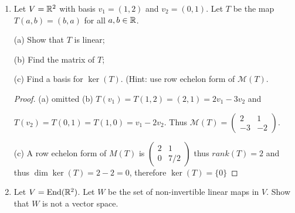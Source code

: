 \documentclass{amsart}
\begin{document}
\begin{enumerate}
(a) Does $v_1,\cdots,v_4$ form a basis of $\rr^4$?

(b) Is $v_3$ in $\s(v_1,v_2,v_4)$? If so, write $v_3$ as a linear combination of them.

(Hint: You may use: permuted LU factorization; some properties about matrix multiplication and invertible maps. )

\begin{proof}
	\color{blue} 
	(a) No, the rank of the matrix is $3$ (from the number of pivots), therefore the column span has dimension $3$ which is smaller than $\dim(\rr^4)=4$.
	
	(b) Let $w_1,\cdots,w_4$ be the column vector of the row echelon form $U$ of $A$. 
	Use LU factorization, we know that $PA=LU$, where $U$ is the row echelon form above. In other words, $A=P^{-1}LU$, and set $P^{-1}L=K$. We know that $P$ and $L$ are all products of invertible matrices so $K$ must be also invertible. By properties of matrix product, we have that $w_i=K v_i$. Since $w_1,\cdots,w_4$ are in row echelon form, we know that $w_1,w_2,w_4$ (the columns that contain a pivot) form a basis of the column space. Therefore, by invertibility of $K$, $v_1=K^{-1}w_1,v_2=K^{-1}w_2,v_4=K^{-1}w_4$ also form a basis of the column space, thus $v_3\in \s(v_1,v_2,v_4)$. 
	
	From the row echelon form matrix, we know that $w_3=3w_1-2w_2$, thus $K^{-1}w_3=3K^{-1}w_1-2K^{-1}w_2$, thus $v_3=3v_1-2v_2$.
\end{proof}
\item Let $V=\mathbb{R}^2$ with basis $v_1 = (1,2)$ and $v_2= (0,1)$. Let $T$ be the map $T(a,b)=(b,a)$ for all $a,b\in\mathbb{R}$.

(a) Show that $T$ is linear;

(b) Find the matrix of $T$;

(c) Find a basis for $\ker(T)$. (Hint: use row echelon form of $\mathcal{M}(T)$. 
\begin{proof}
	\color{blue}
	(a) omitted
	(b) $T(v_1)=T(1,2)=(2,1)=2v_1-3v_2$ and 
	
	$T(v_2)=T(0,1)=T(1,0)= v_1-2v_2$. Thus $\mathcal{M}(T)=\begin{pmatrix}
		2&1\\-3&-2
	\end{pmatrix}$.
	
	(c) A row echelon form of $M(T)$ is $\begin{pmatrix}
		2&1\\0&7/2
	\end{pmatrix}$ thus $rank(T)=2$ and thus $\dim\ker(T)=2-2=0$, therefore $\ker(T)=\{0\}$\end{proof}
\item Let $V=\text{End}({\mathbb{R}^2})$. Let $W$ be the set of non-invertible linear maps in $V$. Show that $W$ is not a vector space.


\end{enumerate}
\end{document}
